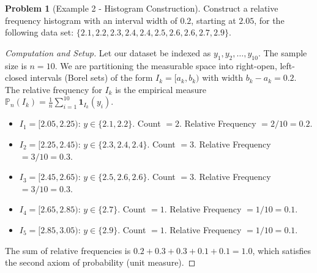 \documentclass[11pt]{article}
\theoremstyle{definition}
\newtheorem{problem}{Problem}
\theoremstyle{remark}
\newcommand{\Prob}{\mathbb{P}}
\begin{document}
\begin{problem}[Example 2 - Histogram Construction]
Construct a relative frequency histogram with an interval width of $0.2$, starting at $2.05$, for the following data set:
$\{2.1, 2.2, 2.3, 2.4, 2.4, 2.5, 2.6, 2.6, 2.7, 2.9\}$.
\end{problem}
\begin{proof}[Computation and Setup]
Let our dataset be indexed as $y_1, y_2, \dots, y_{10}$. The sample size is $n=10$. We are partitioning the measurable space into right-open, left-closed intervals (Borel sets) of the form $I_k = [a_k, b_k)$ with width $b_k - a_k = 0.2$. The relative frequency for $I_k$ is the empirical measure $\Prob_n(I_k) = \frac{1}{n}\sum_{i=1}^{10} \mathbf{1}_{I_k}(y_i)$.
\begin{itemize}
    \item $I_1 = [2.05, 2.25)$: $y \in \{2.1, 2.2\}$. Count $= 2$. Relative Frequency $= 2/10 = 0.2$.
    \item $I_2 = [2.25, 2.45)$: $y \in \{2.3, 2.4, 2.4\}$. Count $= 3$. Relative Frequency $= 3/10 = 0.3$.
    \item $I_3 = [2.45, 2.65)$: $y \in \{2.5, 2.6, 2.6\}$. Count $= 3$. Relative Frequency $= 3/10 = 0.3$.
    \item $I_4 = [2.65, 2.85)$: $y \in \{2.7\}$. Count $= 1$. Relative Frequency $= 1/10 = 0.1$.
    \item $I_5 = [2.85, 3.05)$: $y \in \{2.9\}$. Count $= 1$. Relative Frequency $= 1/10 = 0.1$.
\end{itemize}
The sum of relative frequencies is $0.2 + 0.3 + 0.3 + 0.1 + 0.1 = 1.0$, which satisfies the second axiom of probability (unit measure). 
\end{proof}
\end{document}
